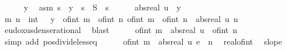 \begin{isabellebody}
\isanewline
\ \ \ \ \isamarkupfalse%
\ y\ \isamarkupfalse%
\ asm{\isacharcolon}{\kern0pt}\ {\isachardoublequoteopen}s\ {\isasymle}\ y{\isachardoublequoteclose}\ \ {\isachardoublequoteopen}s\ {\isasymin}\ S{\isachardoublequoteclose}\ \ s\isanewline
\ \ \ \ \isamarkupfalse%
\ {\isachardoublequoteopen}abs{\isacharunderscore}{\kern0pt}real\ u\ {\isachargreater}{\kern0pt}\ y{\isachardoublequoteclose}\isanewline
\ \ \ \ \isamarkupfalse%
\ \isamarkupfalse%
\ m\ n\ {\isacharcolon}{\kern0pt}{\isacharcolon}{\kern0pt}\ int\ \ {\isacharasterisk}{\kern0pt}{\isacharcolon}{\kern0pt}\ {\isachardoublequoteopen}y\ {\isacharless}{\kern0pt}\ {\isacharparenleft}{\kern0pt}of{\isacharunderscore}{\kern0pt}int\ m\ {\isacharslash}{\kern0pt}\ of{\isacharunderscore}{\kern0pt}int\ n{\isacharparenright}{\kern0pt}{\isachardoublequoteclose}\ {\isachardoublequoteopen}{\isacharparenleft}{\kern0pt}of{\isacharunderscore}{\kern0pt}int\ m\ {\isacharslash}{\kern0pt}\ of{\isacharunderscore}{\kern0pt}int\ n{\isacharparenright}{\kern0pt}\ {\isacharless}{\kern0pt}\ abs{\isacharunderscore}{\kern0pt}real\ u{\isachardoublequoteclose}\ {\isachardoublequoteopen}n\ {\isachargreater}{\kern0pt}\ {}{\isachardoublequoteclose}\ \isamarkupfalse%
\ eudoxus{\isacharunderscore}{\kern0pt}dense{\isacharunderscore}{\kern0pt}rational\ \isamarkupfalse%
\ blast\isanewline
\ \ \ \ \isamarkupfalse%
\ {\isachardoublequoteopen}of{\isacharunderscore}{\kern0pt}int\ m\ {\isacharless}{\kern0pt}\ abs{\isacharunderscore}{\kern0pt}real\ u\ {\isacharasterisk}{\kern0pt}\ of{\isacharunderscore}{\kern0pt}int\ n{\isachardoublequoteclose}\ \isamarkupfalse%
\ {\isacharparenleft}{\kern0pt}simp\ add{\isacharcolon}{\kern0pt}\ pos{\isacharunderscore}{\kern0pt}divide{\isacharunderscore}{\kern0pt}less{\isacharunderscore}{\kern0pt}eq{\isacharparenright}{\kern0pt}\isanewline
\ \ \ \ \isamarkupfalse%
\ {\isachardoublequoteopen}of{\isacharunderscore}{\kern0pt}int\ m\ {\isacharless}{\kern0pt}\ abs{\isacharunderscore}{\kern0pt}real\ {\isacharparenleft}{\kern0pt}u\ {\isacharasterisk}{\kern0pt}\isactrlsub e\ {\isacharparenleft}{\kern0pt}{\isacharasterisk}{\kern0pt}{\isacharparenright}{\kern0pt}\ n{\isacharparenright}{\kern0pt}{\isachardoublequoteclose}\ \isamarkupfalse%
\ real{\isacharunderscore}{\kern0pt}of{\isacharunderscore}{\kern0pt}int\ \isamarkupfalse%
\ slope\ \isamarkupfalse%

\end{isabellebody}

